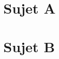 {\center\section*{Sujet A}}

\newcommand{\pts}[1]{\textbf{(/ #1 points)}}

% 


% 



\newpage
{\center\section*{Sujet B}}


